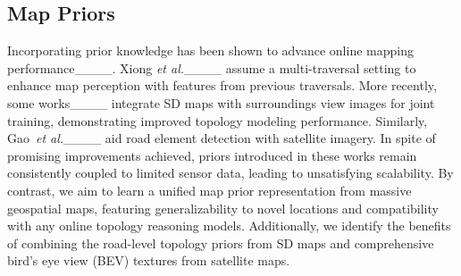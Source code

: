 
\subsection{Map Priors}
Incorporating prior knowledge has been shown to advance online mapping performance____. Xiong \textit{et al.}____ assume a multi-traversal setting to enhance map perception with features from previous traversals. More recently, some works____ integrate SD maps with surroundings view images for joint training, demonstrating improved topology modeling performance. Similarly, Gao~\textit{et al.}____ aid road element detection with satellite imagery. In spite of promising improvements achieved, priors introduced in these works remain consistently coupled to limited sensor data, leading to unsatisfying scalability.
By contrast, we aim to learn a unified map prior representation from massive geospatial maps, featuring generalizability to novel locations and compatibility with any online topology reasoning models.
Additionally, we identify the benefits of combining the road-level topology priors from SD maps and comprehensive bird's eye view (BEV) textures from satellite maps.



